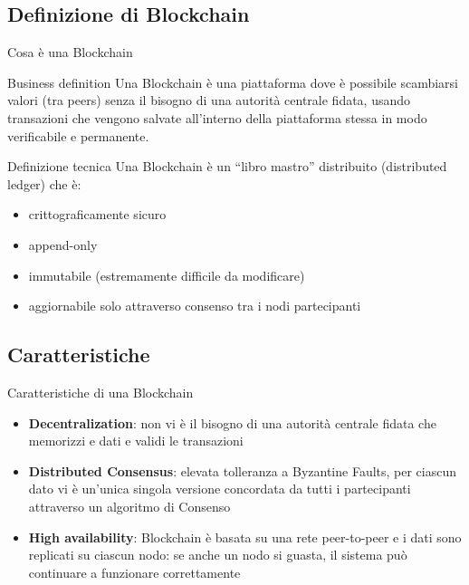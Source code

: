 \documentclass{beamer}
\begin{document}
  \subsection{Definizione di Blockchain}
  \begin{frame}{Cosa è una Blockchain}
    \begin{block}{Business definition}
      Una Blockchain è una piattaforma dove è possibile scambiarsi valori (tra peers) senza il bisogno di una autorità centrale fidata, usando transazioni che vengono salvate all'interno della piattaforma stessa in modo verificabile e permanente. 
    \end{block}
    
    \pause
    \begin{block}{Definizione tecnica}
      Una Blockchain è un ``libro mastro'' distribuito (distributed ledger) che è:
      \begin{itemize}
        \item crittograficamente sicuro 
        \item append-only
        \item immutabile (estremamente difficile da modificare)
        \item aggiornabile solo attraverso consenso tra i nodi partecipanti
      \end{itemize}
    \end{block}
  \end{frame}



  \subsection{Caratteristiche}
  \begin{frame}{Caratteristiche di una Blockchain}
    \begin{itemize}
      \item \textbf{Decentralization}: non vi è il bisogno di una autorità centrale fidata che memorizzi e dati e validi le transazioni \pause
      \item \textbf{Distributed Consensus}: elevata tolleranza a Byzantine Faults, per ciascun dato vi è un'unica singola versione concordata da tutti i partecipanti attraverso un algoritmo di Consenso \pause
      \item \textbf{High availability}: Blockchain è basata su una rete peer-to-peer e i dati sono replicati su ciascun nodo: se anche un nodo si guasta, il sistema può continuare a funzionare correttamente
    \end{itemize}
  \end{frame}
\end{document}
